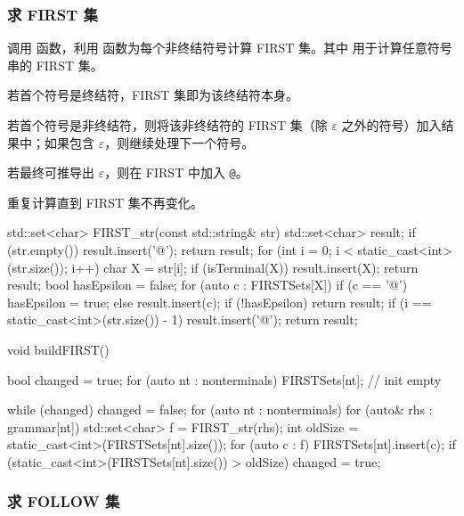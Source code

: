 \subsubsection{求 FIRST 集}

调用  函数，利用  函数为每个非终结符号计算 FIRST 集。其中  用于计算任意符号串的 FIRST 集。\begin{compactitem}
    \item 若首个符号是终结符，FIRST 集即为该终结符本身。
    \item 若首个符号是非终结符，则将该非终结符的 FIRST 集（除 $\varepsilon$ 之外的符号）加入结果中；如果包含 $\varepsilon$，则继续处理下一个符号。
    \item 若最终可推导出 $\varepsilon$，则在 FIRST 中加入 \verb|@|。
\end{compactitem}
重复计算直到 FIRST 集不再变化。
\begin{cppcode}
std::set<char> FIRST_str(const std::string& str)
{
    std::set<char> result;
    if (str.empty()) {
        result.insert('@');
        return result;
    }
    for (int i = 0; i < static_cast<int>(str.size()); i++) {
        char X = str[i];
        if (isTerminal(X)) {
            result.insert(X);
            return result;
        }
        bool hasEpsilon = false;
        for (auto c : FIRSTSets[X]) {
            if (c == '@') {
                hasEpsilon = true;
            } else {
                result.insert(c);
            }
        }
        if (!hasEpsilon) {
            return result;
        }
        if (i == static_cast<int>(str.size()) - 1) {
            result.insert('@');
        }
    }
    return result;
}

void buildFIRST()
{
    bool changed = true;
    for (auto nt : nonterminals) {
        FIRSTSets[nt]; // init empty
    }

    while (changed) {
        changed = false;
        for (auto nt : nonterminals) {
            for (auto& rhs : grammar[nt]) {
                std::set<char> f = FIRST_str(rhs);
                int oldSize = static_cast<int>(FIRSTSets[nt].size());
                for (auto c : f) {
                    FIRSTSets[nt].insert(c);
                }
                if (static_cast<int>(FIRSTSets[nt].size()) > oldSize) {
                    changed = true;
                }
            }
        }
    }
}
\end{cppcode}

\subsubsection{求 FOLLOW 集}

